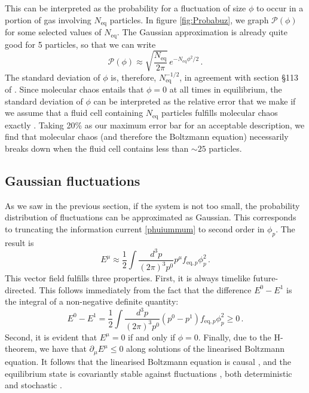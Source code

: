 \documentclass[aps,prd,preprint,nofootinbib,amsmath,amssymb,showpacs,longbibliography,singlecolumn,superscriptaddress,10pt]{revtex4-1}
\theoremstyle{plain}
\theoremstyle{definition}
\begin{document}
This can be interpreted as the probability for a fluctuation of size $\phi$ to occur in a portion of gas involving $N_{\text{eq}}$ particles. In figure \ref{fig:Probabuz}, we graph $\mathcal{P}(\phi)$ for some selected values of $N_{\text{eq}}$. The Gaussian approximation is already quite good for 5 particles, so that we can write
\begin{equation}
\label{eq:prob-dist-gauss-box}
    \mathcal{P}(\phi)\approx \sqrt{\dfrac{N_{\text{eq}}}{2\pi}} \, e^{-N_{\text{eq}}\phi^2/2} \, .
\end{equation}
The standard deviation of $\phi$ is, therefore, $N_{\text{eq}}^{-1/2}$, in agreement with section \S 113 of \cite{landau_statistical_1980}. Since molecular chaos entails that $\phi=0$ at all times in equilibrium, the standard deviation of $\phi$ can be interpreted as the relative error that we make if we assume that a fluid cell containing $N_{\text{eq}}$ particles fulfills molecular chaos exactly \cite{huang_book}. Taking 20\% as our maximum error bar for an acceptable description, we find that molecular chaos (and therefore the Boltzmann equation) necessarily breaks down when the fluid cell contains less than $\sim 25$ particles.

\subsection{Gaussian fluctuations}\label{TheGaussone}

As we saw in the previous section, if the system is not too small, the probability distribution of fluctuations can be approximated as Gaussian. This corresponds to truncating the information current \eqref{phuiummum} to second order in $\phi_p$. The result is
\begin{equation}\label{Eq:Kinetic_theory_E}
   E^\mu \approx \dfrac{1}{2} \int \dfrac{d^3 p}{(2\pi)^3 p^0} p^\mu f_{\text{eq},p} \phi^2_p\, .
\end{equation}
This vector field fulfills three properties. First, it is always timelike future-directed. This follows immediately from the fact that the difference $E^0-E^1$ is the integral of a non-negative definite quantity:
\begin{equation}
    E^0-E^1 = \dfrac{1}{2} \int \dfrac{d^3 p}{(2\pi)^3 p^0} (p^0{-}p^1) f_{\text{eq},p} \phi^2_p \geq 0 \, .
\end{equation}
Second, it is evident that $E^\mu=0$ if and only if $\phi=0$. Finally, due to the H-theorem, we have that $\partial_\mu E^\mu \leq 0$ along solutions of the linearised Boltzmann equation. It follows that the linearised Boltzmann equation is causal \cite{Gavassino:2021kjm}, and the equilibrium state is covariantly stable against fluctuations \cite{Gavassino:2021cli}, both deterministic and stochastic \cite{Gavassino:2024vyu}.
\end{document}
